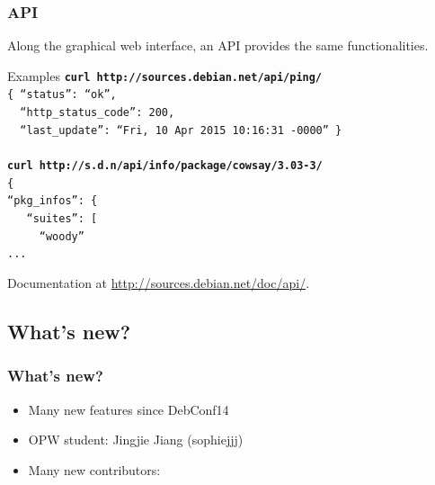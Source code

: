 \documentclass{beamer}
\begin{document}
\begin{frame}
  \frametitle{API}
  Along the graphical web interface, an API provides the same
  functionalities.
  \pause
  \begin{block}{Examples}
    \texttt{\textbf{curl http://sources.debian.net/api/ping/}\\
      \{
        ``status'': ``ok'',\\
        ~~``http\_status\_code'': 200,\\
        ~~``last\_update'': ``Fri, 10 Apr 2015 10:16:31 -0000''
      \}}
    \\ ~ \\
    \texttt{\textbf{curl
        http://s.d.n/api/info/package/cowsay/3.03-3/}\\
      \{\\
        ``pkg\_infos'': \{\\
        ~~  ``suites'': [\\
        ~~~~      ``woody''\\
      ...}
  \end{block}
  Documentation at \url{http://sources.debian.net/doc/api/}.
\end{frame}

\subsection{What's new?}

\begin{frame}
  \frametitle{What's new?}
  \begin{itemize}
  \item Many new features since DebConf14
    \pause
  \item OPW student: Jingjie Jiang (sophiejjj)
    \pause
  \item Many new contributors:
    \begin{itemize}
    \end{itemize}
  \end{itemize}
\end{frame}
\end{document}

